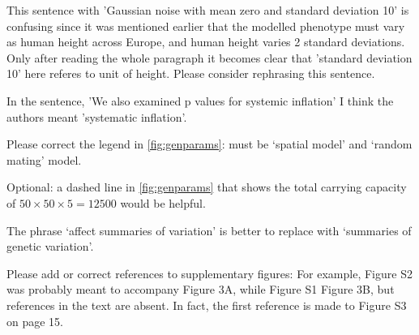 
\begin{point}{\revref}
    This sentence with 'Gaussian noise with mean zero and standard deviation 10' is confusing since it was mentioned earlier that the modelled phenotype must vary as human height across Europe, and human height varies 2 standard deviations. Only after reading the whole paragraph it becomes clear that 'standard deviation 10' here referes to unit of height. Please consider rephrasing this sentence.
\end{point}


\begin{point}{\revref}
    In the sentence, 'We also examined p values for systemic inflation' I think the authors meant 'systematic inflation'.
\end{point}


\begin{point}{}
    Please correct the legend in \autoref{fig:genparams}:
    must be `spatial model' and `random mating' model.
\end{point}


\begin{point}{}
    Optional: a dashed line in \autoref{fig:genparams}
    that shows the total carrying capacity of $50 \times 50 \times 5=12500$ would be helpful.
\end{point}


\begin{point}{\revref}
    The phrase `affect summaries of variation' is better to replace with `summaries of genetic variation'.
\end{point}


\begin{point}{}
    Please add or correct references to supplementary figures: For example, Figure S2 was probably meant to accompany Figure 3A, while Figure S1 Figure 3B, but references in the text are absent. In fact, the first reference is made to Figure S3 on page 15.
\end{point}

